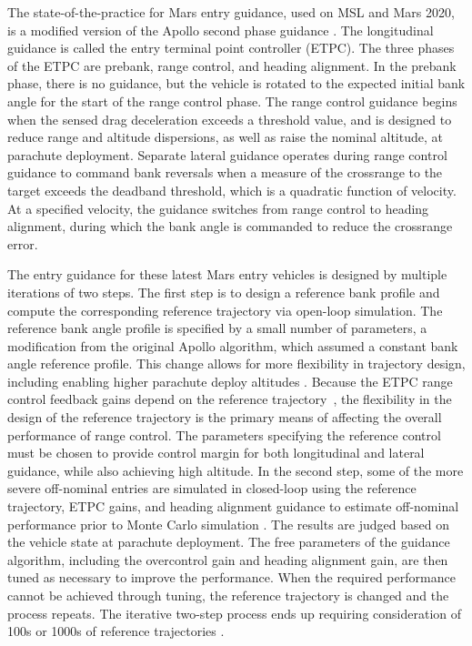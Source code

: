 \documentclass[journal ]{new-aiaa}
\begin{document}
The state-of-the-practice for Mars entry guidance, used on MSL and Mars 2020, is a modified version of the Apollo second phase guidance \cite{MSL_EDL2}. The longitudinal guidance is called the entry terminal point controller (ETPC). 
The three phases of the ETPC are prebank, range control, and heading alignment. In the prebank phase, there is no guidance, but the vehicle is rotated to the expected initial bank angle for the start of the range control phase.
The range control guidance begins when the sensed drag deceleration exceeds a threshold value, and 
is designed to reduce range and altitude dispersions, as well as raise the nominal altitude, at parachute deployment. Separate lateral guidance operates during range control guidance to command bank reversals when a measure of the crossrange to the target exceeds the deadband threshold, which is a quadratic function of velocity. At a specified velocity, the guidance switches from range control to heading alignment, during which the bank angle is commanded to reduce the crossrange error.

The entry guidance for these latest Mars entry vehicles \cite{MSL_EDL2,M2020_EDL} is designed by multiple iterations of two steps. The first step is to design a reference bank profile and compute the corresponding reference trajectory via open-loop simulation. The reference bank angle profile is specified by a small number of parameters, a modification from the original Apollo algorithm, which assumed a constant bank angle reference profile. This change allows for more flexibility in trajectory design, including enabling higher parachute deploy altitudes \cite{MSL_EDL2}. Because the ETPC range control feedback gains depend on the reference trajectory~\cite{Apollo}, the flexibility in the design of the reference trajectory is the primary means of affecting the overall performance of range control. The parameters specifying the reference control must be chosen to provide control margin for both longitudinal and lateral guidance, while also achieving high altitude.
In the second step, some of the more severe off-nominal entries are simulated in closed-loop using the reference trajectory, ETPC gains, and heading alignment guidance to estimate off-nominal performance prior to Monte Carlo simulation \cite{MSL_EDL2}. The results are judged based on the vehicle state at parachute deployment. The free parameters of the guidance algorithm, including the overcontrol gain and heading alignment gain, are then tuned as necessary to improve the performance. When the required performance cannot be achieved through tuning, the reference trajectory is changed and the process repeats. The iterative two-step process ends up requiring consideration of 100s or 1000s of reference trajectories \cite{MSL_EDL2}.
 
\end{document}
